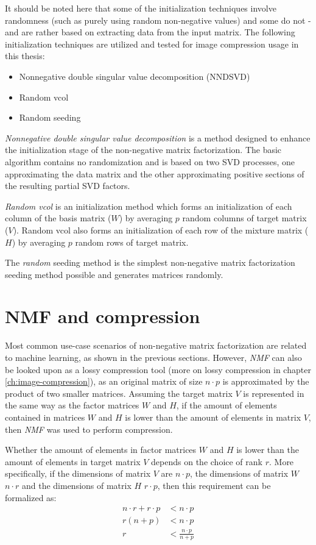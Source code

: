 \documentclass[thesis=M,english]{FITthesis}[2012/10/20]
\begin{document}
It should be noted here that some of the initialization techniques involve randomness
(such as purely using random non-negative values) and some do not - and are rather
based on extracting data from the input matrix. The following initialization techniques
are utilized and tested for image compression usage in this thesis:

\begin{itemize}
  \item Nonnegative double singular value decomposition (NNDSVD)
  \item Random vcol
  \item Random seeding
\end{itemize}

\emph{Nonnegative double singular value decomposition} is a method designed
to enhance the initialization stage of the non-negative matrix factorization.
The basic algorithm contains no randomization and is based on two SVD processes,
one approximating the data matrix and the other approximating positive sections
of the resulting partial SVD factors. \cite{nndsvd}

\emph{Random vcol} is an initialization method which forms an initialization of
each column of the basis matrix ($W$) by averaging $p$ random columns of
target matrix ($V$). Random vcol also forms an initialization of each row
of the mixture matrix ($H$) by averaging $p$ random rows of target matrix.
\cite{randomvcol}

The \emph{random} seeding method is the simplest non-negative matrix
factorization seeding method possible and generates matrices randomly.


\section{NMF and compression}
Most common use-case scenarios of non-negative matrix factorization are
related to machine learning, as shown in the previous sections. However,
\emph{NMF} can also be looked upon as a lossy compression tool (more
on lossy compression in chapter \ref{ch:image-compression}), as an
original matrix of size $n \cdot p$ is approximated by the product
of two smaller matrices. Assuming the target matrix $V$ is represented
in the same way as the factor matrices $W$ and $H$, if the amount
of elements contained in matrices $W$ and $H$ is lower than the amount of
elements in matrix $V$, then \emph{NMF} was used to perform compression.

Whether the amount of elements in factor matrices $W$ and $H$ is lower than
the amount of elements in target matrix $V$ depends on the choice of rank $r$.
More specifically, if the dimensions of matrix $V$ are $n \cdot p$, the
dimensions of matrix $W$ $n \cdot r$ and the dimensions of matrix $H$
$r \cdot p$, then this requirement can be formalized as:
\begin{align*}
  n \cdot r + r \cdot p &< n \cdot p\\
  r (n + p) &< n \cdot p\\
  r &< \frac{n \cdot p}{n + p}
\end{align*}
\end{document}
